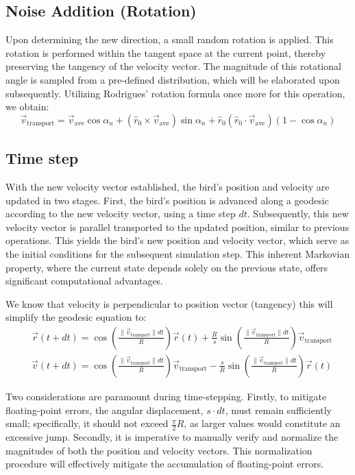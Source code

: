 \documentclass[12pt,a4paper]{article}
\begin{document}
\subsection{Noise Addition (Rotation)}
Upon determining the new direction, a small random rotation is applied. This rotation is performed within the tangent space at the current point, thereby preserving the tangency of the velocity vector. The magnitude of this rotational angle is sampled from a pre-defined distribution, which will be elaborated upon subsequently. Utilizing Rodrigues' rotation formula once more for this operation, we obtain:
\[
\vec{v}_{\text{transport}} = \vec{v}_{\text{ave}} \cos\alpha_n + (\hat{r}_0 \times \vec{v}_{\text{ave}}) \sin\alpha_n + \hat{r}_0 (\hat{r}_0 \cdot \vec{v}_{\text{ave}}) (1 - \cos\alpha_n)
\]

\subsection{Time step}

With the new velocity vector established, the bird's position and velocity are updated in two stages. First, the bird's position is advanced along a geodesic according to the new velocity vector, using a time step \(dt\). Subsequently, this new velocity vector is parallel transported to the updated position, similar to previous operations. This yields the bird's new position and velocity vector, which serve as the initial conditions for the subsequent simulation step. This inherent Markovian property, where the current state depends solely on the previous state, offers significant computational advantages. 

We know that velocity is perpendicular to position vector (tangency) this will simplify the geodesic equation to:
\begin{align}
\label{eq:geodesic}
& \vec{r}(t+dt) =  \cos\left(\frac{\|\vec{v}_{\text{transport}}\| dt}{R}\right) \vec{r}(t)+ \frac{R}{s} \sin\left(\frac{\|\vec{v}_{\text{transport}}\| dt}{R}\right) \vec{v}_{\text{transport}} \\
& \vec{v}(t+dt) =  \cos\left(\frac{\|\vec{v}_{\text{transport}}\| dt}{R}\right) \vec{v}_{\text{transport}}- \frac{s}{R} \sin\left(\frac{\|\vec{v}_{\text{transport}}\| dt}{R}\right) \vec{r}(t)
\end{align}

Two considerations are paramount during time-stepping. Firstly, to mitigate floating-point errors, the angular displacement, \(s \cdot dt\), must remain sufficiently small; specifically, it should not exceed \(\frac{\pi}{2} R\), as larger values would constitute an excessive jump. Secondly, it is imperative to manually verify and normalize the magnitudes of both the position and velocity vectors. This normalization procedure will effectively mitigate the accumulation of floating-point errors.
\end{document}
